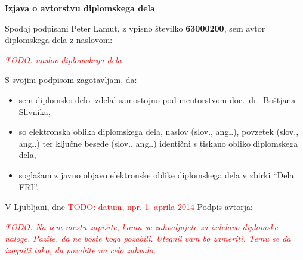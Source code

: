 \documentclass[a4paper, 12pt]{book}
\newcommand{\TODO}[1]{\textcolor{red}{TODO: #1}}
\newcommand{\clearemptydoublepage}{\newpage{\pagestyle{empty}\cleardoublepage}}
\begin{document}
\clearemptydoublepage


\label{izjava_avtorstvo}

\vspace*{1cm}
\begin{center} 
{\Large \textbf{\sc Izjava o avtorstvu diplomskega dela}}
\end{center}

\vspace{1cm}
\noindent Spodaj podpisani Peter Lamut,
z vpisno številko \textbf{63000200}, sem avtor diplomskega dela z naslovom:
   
\vspace{0.5cm}
\emph{\TODO{naslov diplomskega dela}}

\vspace{1.5cm}
\noindent S svojim podpisom zagotavljam, da:

\begin{itemize}
	\item sem diplomsko delo izdelal samostojno pod mentorstvom 
		doc.\ dr.\ Boštjana Slivnika,

	\item so elektronska oblika diplomskega dela, naslov (slov., angl.), povzetek (slov., angl.) ter ključne besede (slov., angl.) identični s tiskano obliko diplomskega dela,
	
	\item soglašam z javno objavo elektronske oblike diplomskega dela v zbirki ``Dela FRI''.
\end{itemize}

\vspace{1cm}

\noindent V Ljubljani, dne \TODO{datum, npr. 1. aprila 2014} \hfill Podpis avtorja:

\clearemptydoublepage



\label{zahvala}
\thispagestyle{empty}\mbox{}\vfill\null\it%
\TODO{Na tem mestu zapišite, komu se zahvaljujete za izdelavo diplomske naloge. Pazite, da ne boste koga pozabili. Utegnil vam bo zameriti. Temu se da izogniti tako, da pozabite na celo zahvalo.}
\rm\normalfont

\clearemptydoublepage


\label{kazalo}
\def\thepage{}%
\tableofcontents{}
\end{document}
